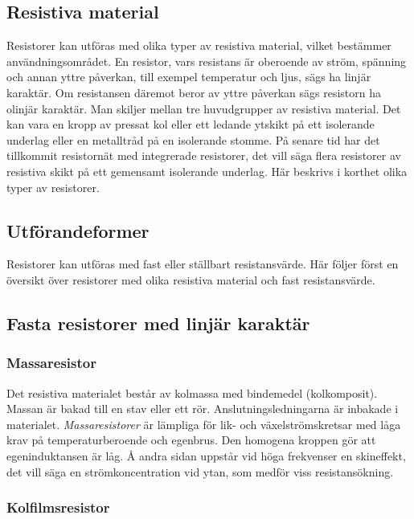 \subsection{Resistiva material}

Resistorer kan utföras med olika typer av resistiva material, vilket bestämmer
användningsområdet. En resistor, vars resistans är oberoende av ström, spänning
och annan yttre påverkan, till exempel temperatur och ljus, sägs ha linjär karaktär.
Om resistansen däremot beror av yttre påverkan sägs resistorn ha olinjär
karaktär. Man skiljer mellan tre huvudgrupper av resistiva material. Det kan
vara en kropp av pressat kol eller ett ledande ytskikt på ett isolerande
underlag eller en metalltråd på en isolerande stomme. På senare tid har det
tillkommit resistornät med integrerade resistorer, det vill säga flera resistorer av
resistiva skikt på ett gemensamt isolerande underlag. Här beskrivs i korthet
olika typer av resistorer.

\subsection{Utförandeformer}

Resistorer kan utföras med fast eller ställbart resistansvärde. Här följer
först en översikt över resistorer med olika resistiva material och fast
resistansvärde.

\subsection{Fasta resistorer med linjär karaktär}
\label{fasta_resistorer_linjära}

\subsubsection{Massaresistor}

Det resistiva materialet består av kolmassa med bindemedel (kolkomposit).
Massan är bakad till en stav eller ett rör. Anslutningsledningarna är inbakade
i materialet.
\emph{Massaresistorer} är lämpliga för lik- och växelströmskretsar med
låga krav på temperaturberoende och egenbrus. Den homogena kroppen gör att
egeninduktansen är låg. Å andra sidan uppstår vid höga frekvenser en skineffekt, 
det vill säga en strömkoncentration vid ytan, som medför viss resistansökning.

\subsubsection{Kolfilmsresistor}


